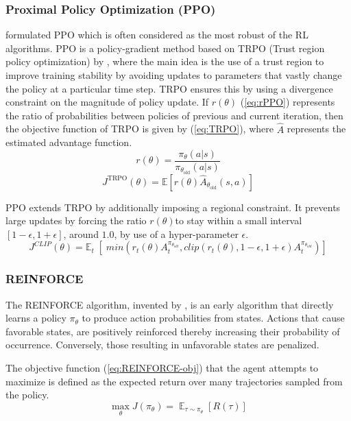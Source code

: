 \documentclass[a4paper, 12pt]{article}
\begin{document}
\subsubsection*{Proximal Policy Optimization (PPO)} 
\cite{PPO-schulman2017} formulated PPO which is often considered as the most robust of the RL algorithms. PPO is a policy-gradient method based on TRPO (Trust region policy optimization) by \cite{TRPO-schulman2015}, where the main idea is the use of a trust region to improve training stability by avoiding updates to parameters that vastly change the policy at a particular time step. TRPO ensures this by using a divergence constraint on the magnitude of policy update. If $r(\theta)$ (\ref{eq:rPPO}) represents the ratio of probabilities between policies of previous and current iteration, then the objective function of TRPO is given by (\ref{eq:TRPO}), where $\hat{A}$ represents the estimated advantage function.
\begin{equation}\label{eq:rPPO}
	r(\theta) = \frac{\pi_\theta(a \vert s)}{\pi_{\theta_\text{old}}(a \vert s)}
\end{equation}
\begin{equation}\label{eq:TRPO}
	J^\text{TRPO} (\theta) = \mathbb{E} [ r(\theta) \hat{A}_{\theta_\text{old}}(s, a) ]
\end{equation}

PPO extends TRPO by additionally imposing a regional constraint. It prevents large updates by forcing the ratio $r(\theta)$to stay within a small interval $[1-\epsilon, 1+\epsilon]$, around $1.0$, by use of a hyper-parameter $\epsilon$.
\begin{equation}
	J^{CLIP} (\theta) = \mathbb{E}_t \; [ \; min (r_t(\theta) A^{\pi_{\theta_{old}}}_t, clip(r_t(\theta), 1-\epsilon, 1+\epsilon) A^{\pi_{\theta_{old}}}_t)]
	\label{eq:PPO}
\end{equation}

\subsubsection*{REINFORCE} 
The REINFORCE algorithm, invented by \cite{REINFORCE-williams1992}, is an early algorithm that directly learns a policy $\pi_\theta$ to produce action probabilities from states. Actions that cause favorable states, are positively reinforced thereby increasing their probability of occurrence. Conversely, those resulting in unfavorable states are penalized.

The objective function (\ref{eq:REINFORCE-obj}) that the agent attempts to maximize is defined as the expected return over many trajectories sampled from the policy.
\begin{equation}\label{eq:REINFORCE-obj}
	\max_{\theta} J(\pi_{\theta}) = \mathop{\mathbb{E}}_{\tau \sim \pi_\theta} [R(\tau)]
\end{equation}
\end{document}
